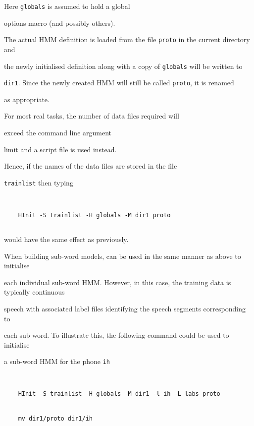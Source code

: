 Here \texttt{globals} is assumed to hold a global 


options macro  (and possibly others).  


The actual HMM definition is loaded from the file \texttt{proto} in the current directory and


the newly initialised definition along with a copy of \texttt{globals} will be written to


\texttt{dir1}.  Since the newly created HMM will still be called \texttt{proto}, it is renamed


as appropriate.





For most real tasks, the number of data files required will 


exceed the command line argument


limit and a script file is used instead.  


Hence, if the names of the data files are stored in the file


\texttt{trainlist} then typing


\begin{verbatim}


    HInit -S trainlist -H globals -M dir1 proto


\end{verbatim}


would have the same effect as previously.










When building sub-word models,  can be used in the same manner as above to initialise


each individual sub-word HMM.  However, in this case, the training data is typically continuous


speech with associated label files identifying the speech segments corresponding to


each sub-word.  To illustrate this, the following command could be used to initialise


a sub-word HMM for the phone \texttt{ih}


\begin{verbatim}


    HInit -S trainlist -H globals -M dir1 -l ih -L labs proto


    mv dir1/proto dir1/ih


\end{verbatim}



